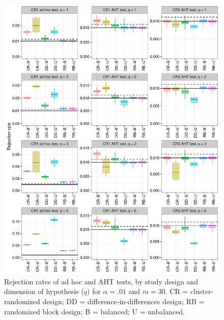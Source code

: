 \documentclass{article}\usepackage[]{graphicx}\usepackage[]{color}
\newenvironment{knitrout}{}{} %
\begin{document}
\begin{knitrout}
\color{fgcolor}\begin{figure}[H]

{\centering \includegraphics[width=\linewidth]{CR_fig/balance_01_30-1} 

}

\caption[Rejection rates of ad hoc and AHT tests, by study design and dimension of hypothesis (]{Rejection rates of ad hoc and AHT tests, by study design and dimension of hypothesis ($q$) for $\alpha = .01$ and $m = 30$. CR = cluster-randomized design; DD = difference-in-differences design; RB = randomized block design; B = balanced; U = unbalanced.}\label{fig:balance_01_30}
\end{figure}


\end{knitrout}
\end{document}
